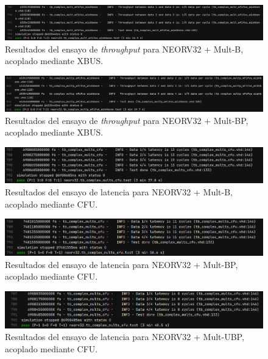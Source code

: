\begin{figure}[H]
    \centering
    \includegraphics[width=14cm]{Figuras/result/thr6.png}
    \caption{Resultados del ensayo de \textit{throughput} para NEORV32 + Mult-B, acoplado mediante XBUS.}
    \label{fig:thr6}
\end{figure}

\begin{figure}[H]
    \centering
    \includegraphics[width=14cm]{Figuras/result/thr7.png}
    \caption{Resultados del ensayo de \textit{throughput} para NEORV32 + Mult-BP, acoplado mediante XBUS.}
    \label{fig:thr7}
\end{figure}

\begin{figure}[H]
    \centering
    \includegraphics[width=14cm]{Figuras/result/lat9.png}
    \caption{Resultados del ensayo de latencia para NEORV32 + Mult-B, acoplado mediante CFU.}
    \label{fig:lat9}
\end{figure}

\begin{figure}[H]
    \centering
    \includegraphics[width=14cm]{Figuras/result/lat10.png}
    \caption{Resultados del ensayo de latencia para NEORV32 + Mult-BP, acoplado mediante CFU.}
    \label{fig:lat10}
\end{figure}

\begin{figure}[H]
    \centering
    \includegraphics[width=14cm]{Figuras/result/lat11.png}
    \caption{Resultados del ensayo de latencia para NEORV32 + Mult-UBP, acoplado mediante CFU.}
    \label{fig:lat11}
\end{figure}

